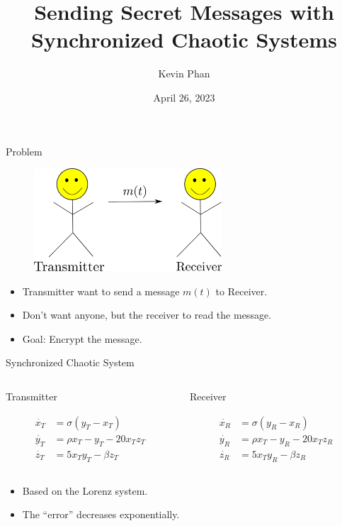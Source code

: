 \documentclass{beamer}
\title[Synchronized Chaos]{Sending Secret Messages with Synchronized
Chaotic Systems}
\author{Kevin Phan}
\institute{Harvey Mudd College}
\date{April 26, 2023}
\begin{document}
\frame{\titlepage}

\begin{frame}{Problem}
    \begin{figure}[H]
        \includegraphics[width=7cm]{drawing.png}
        \centering
    \end{figure}
    \begin{itemize}
        \item Transmitter want to send a message $m(t)$ to Receiver. 
        \item Don't want anyone, but the receiver to read the message.
        \item Goal: Encrypt the message.  
    \end{itemize}
\end{frame}

\begin{frame}{Synchronized Chaotic System}
    \begin{columns}
        \begin{column}{0.5\textwidth}
           \begin{center}
            Transmitter 
           \end{center} 
           \begin{align*}
                \dot{x_T} &= \sigma (y_T - x_T) \\
                \dot{y_T} &= \rho x_T - y_T - 20x_T z_T \\
                \dot{z_T} &= 5x_T y_T - \beta z_T 
           \end{align*}
        \end{column}
        \begin{column}{0.5\textwidth}  
            \begin{center}
                Receiver 
            \end{center} 
            \begin{align*}
                \dot{x_R} &= \sigma (y_R - x_R) \\
                \dot{y_R} &= \rho x_T - y_R - 20x_T z_R \\
                \dot{z_R} &= 5x_T y_R - \beta z_R
            \end{align*}
        \end{column}
        \end{columns} 
         \bigskip
        \begin{itemize}
            \item Based on the Lorenz system. 
            \item The ``error'' decreases exponentially. 
        \end{itemize}
\end{frame}
\end{document}
